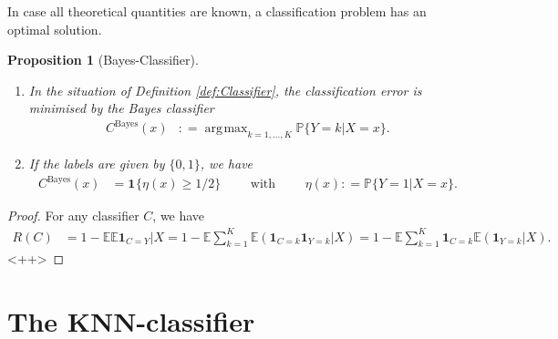 \documentclass[a4paper,11pt]{article} %
\DeclareMathOperator*{\argmax}{arg\!\max}
\theoremstyle{definition}
\theoremstyle{remark}
\theoremstyle{plain}
\newtheorem{prp}[defi]{Proposition}
\numberwithin{equation}{section}
\begin{document}
In case all theoretical quantities are known, a classification problem has an
optimal solution.
\begin{prp}[Bayes-Classifier]%
  \label{prp:BayesClassifier}
  \
  \begin{enumerate}[label=(\roman*)]
    \item In the situation of Definition \ref{def:Classifier}, the
      classification error is minimised by the Bayes classifier
      \begin{align*}
        C^{\text{Bayes}}(x) 
        & : = \argmax_{k = 1, \dots, K} \mathbb{P} \{ Y = k | X = x \}. 
      \end{align*}
    \item If the labels are given by \( \{ 0, 1 \} \), we have
      \begin{align*}
        C^{\text{Bayes}}(x) 
        & = \mathbf{1}_{} \{ \eta(x) \ge 1 / 2 \} 
        \qquad \text{ with } \qquad 
        \eta(x) : = \mathbb{P} \{ Y = 1 | X = x \}.
      \end{align*}
  \end{enumerate}
\end{prp}%
\begin{proof}%
  For any classifier \( C \), we have
  \begin{align*}
    R(C) 
    & =   1 - \mathbb{E} \mathbb{E} \mathbf{1}_{C = Y} | X 
      =   1 
          -
          \mathbb{E} \sum_{k = 1}^{K} 
          \mathbb{E} ( \mathbf{1}_{C = k} \mathbf{1}_{Y = k} | X ) 
      =   1 
          - 
          \mathbb{E} \sum_{k = 1}^{K} 
          \mathbf{1}_{C = k}  
          \mathbb{E} ( \mathbf{1}_{Y = k} | X ). 
  \end{align*}
  <++>
\end{proof}%


\section{The KNN-classifier}%
\label{sec:TheKNNClassifier}
\end{document}
